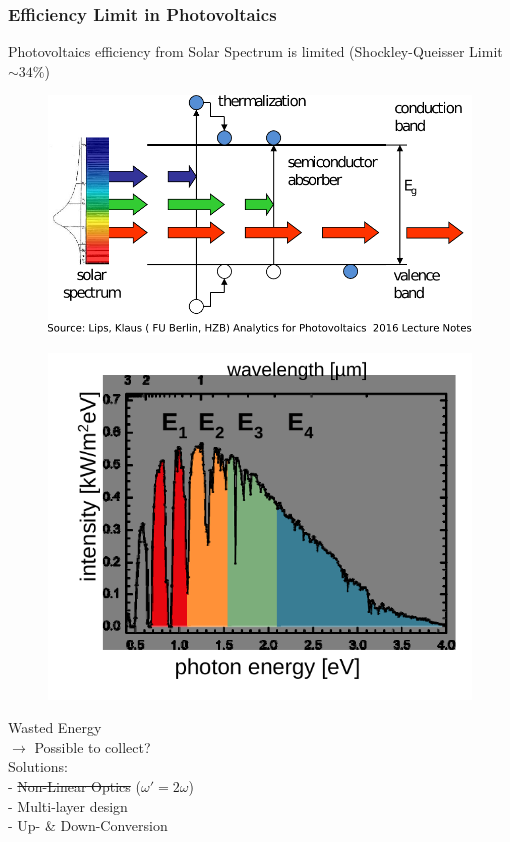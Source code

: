 \documentclass[compress]{beamer}
\begin{document}
\begin{frame}
  \frametitle{Efficiency Limit in Photovoltaics}
Photovoltaics efficiency from Solar Spectrum is limited (Shockley-Queisser Limit $\sim 34\%$)\\
\begin{multicols}{2}
\begin{figure}[H]
	\hspace{-20pt} \includegraphics[width=1.15\columnwidth]{../img/SF_esq14.pdf}
\end{figure}
\begin{figure}[H]
\hspace{60pt}	\includegraphics[width=.85\columnwidth]{../img/SF_esq16.pdf}
\end{figure}

\end{multicols}


\begin{multicols}{2}
Wasted Energy\\
 $\rightarrow$ Possible to collect?\\
\columnbreak
Solutions:\\

- \st{Non-Linear Optics} ($\omega'=2\omega$)\\
- Multi-layer design\\
- Up- \& Down-Conversion
\end{multicols}
\end{frame}
\end{document}
